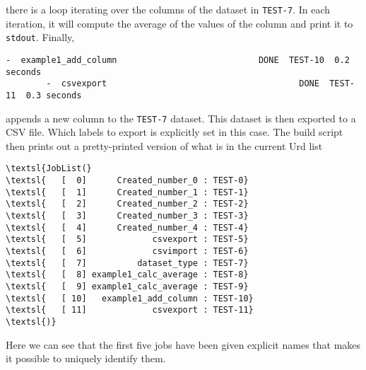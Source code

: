 \documentclass[a4paper]{article}
\begin{document}
\noindent there is a loop iterating over the columns of the dataset in
\texttt{TEST-7}.  In each iteration, it will compute the average of
the values of the column and print it to \texttt{stdout}.  Finally,
\begin{snugshade}
\begin{Verbatim}[commandchars=\\\{\}]
        -  example1_add_column                            DONE  TEST-10  0.2 seconds
        -  csvexport                                      DONE  TEST-11  0.3 seconds
\end{Verbatim}
\end{snugshade}
\noindent appends a new column to the \texttt{TEST-7} dataset.  This
dataset is then exported to a CSV file.  Which labels to export is
explicitly set in this case.  The build script then prints out a
pretty-printed version of what is in the current Urd list
\begin{snugshade}
\begin{Verbatim}[commandchars=\\\{\}]
\textsl{JobList(}
\textsl{   [  0]      Created_number_0 : TEST-0}
\textsl{   [  1]      Created_number_1 : TEST-1}
\textsl{   [  2]      Created_number_2 : TEST-2}
\textsl{   [  3]      Created_number_3 : TEST-3}
\textsl{   [  4]      Created_number_4 : TEST-4}
\textsl{   [  5]             csvexport : TEST-5}
\textsl{   [  6]             csvimport : TEST-6}
\textsl{   [  7]          dataset_type : TEST-7}
\textsl{   [  8] example1_calc_average : TEST-8}
\textsl{   [  9] example1_calc_average : TEST-9}
\textsl{   [ 10]   example1_add_column : TEST-10}
\textsl{   [ 11]             csvexport : TEST-11}
\textsl{)}
\end{Verbatim}
\end{snugshade}
\noindent Here we can see that the first five jobs have been given
explicit names that makes it possible to uniquely identify them.
\end{document}
